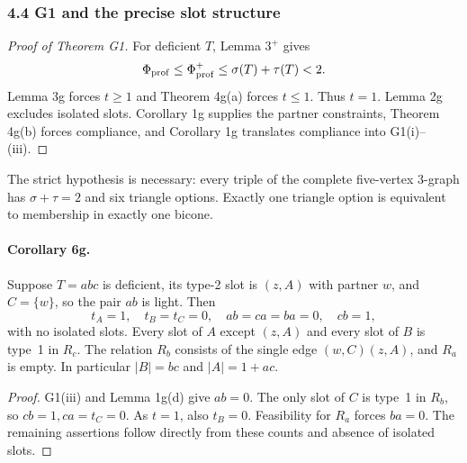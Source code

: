 \subsubsection*{4.4 G1 and the precise slot structure}
\begin{proof}[Proof of Theorem G1]
For deficient $T$, Lemma $3^+$ gives
\[
 \Phi_{\rm prof}\leq\Phi_{\rm prof}^+\leq\sigma(T)+\tau(T)<2.
\]
Lemma 3g forces $t\geq1$ and Theorem 4g(a) forces $t\leq1$. Thus $t=1$. Lemma 2g excludes isolated slots. Corollary 1g supplies the partner constraints, Theorem 4g(b) forces compliance, and Corollary 1g translates compliance into G1(i)--(iii).
\end{proof}
The strict hypothesis is necessary: every triple of the complete five-vertex $3$-graph has $\sigma+\tau=2$ and six triangle options. Exactly one triangle option is equivalent to membership in exactly one bicone.
\paragraph{Corollary 6g.} Suppose $T=abc$ is deficient, its type-2 slot is $(z,A)$ with partner $w$, and $C=\{w\}$, so the pair $ab$ is light. Then
\[
 t_A=1,\quad t_B=t_C=0,\quad ab=ca=ba=0,\quad cb=1,
\]
with no isolated slots. Every slot of $A$ except $(z,A)$ and every slot of $B$ is type~1 in $R_c$. The relation $R_b$ consists of the single edge $(w,C)(z,A)$, and $R_a$ is empty. In particular $|B|=bc$ and $|A|=1+ac$.
\begin{proof}
G1(iii) and Lemma 1g(d) give $ab=0$. The only slot of $C$ is type~1 in $R_b$, so $cb=1,ca=t_C=0$. As $t=1$, also $t_B=0$. Feasibility for $R_a$ forces $ba=0$. The remaining assertions follow directly from these counts and absence of isolated slots.
\end{proof}
